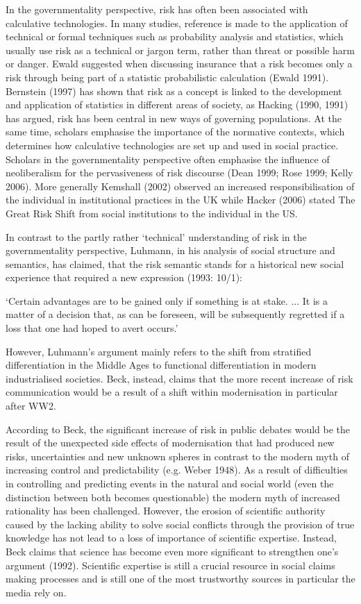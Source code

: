 In the governmentality perspective, risk has often been associated with calculative technologies. In many studies, reference is made to the application of technical or formal techniques such as probability analysis and statistics, which usually use risk as a technical or jargon term, rather than threat or possible harm or danger. Ewald suggested when discussing insurance that a risk becomes only a risk through being part of a statistic probabilistic calculation (Ewald 1991). Bernstein (1997) has shown that risk as a concept is linked to the development and application of statistics in different areas of society, as Hacking (1990, 1991) has argued, risk has been central in new ways of governing populations. At the same time, scholars emphasise the importance of the normative contexts, which determines how calculative technologies are set up and used in social practice. Scholars in the governmentality perspective often emphasise the influence of neoliberalism for the pervasiveness of risk discourse (Dean 1999; Rose 1999; Kelly 2006). More generally Kemshall (2002) observed an increased responsibilisation of the individual in institutional practices in the UK while Hacker (2006) stated The Great Risk Shift from social institutions to the individual in the US. 

In contrast to the partly rather `technical' understanding of risk in the governmentality perspective, Luhmann, in his analysis of social structure and semantics, has claimed, that the risk semantic stands for a historical new social experience that required a new expression (1993: 10\slash 1): 

`Certain advantages are to be gained only if something is at stake. ... It is a matter of a decision that, as can be foreseen, will be subsequently regretted if a loss that one had hoped to avert occurs.'

However, Luhmann's argument mainly refers to the shift from stratified differentiation in the Middle Ages to functional differentiation in modern industrialised societies. Beck, instead, claims that the more recent increase of risk communication would be a result of a shift within modernisation in particular after WW2. 

According to Beck, the significant increase of risk in public debates would be the result of the unexpected side effects of modernisation that had produced new risks, uncertainties and new unknown spheres in contrast to the modern myth of increasing control and predictability (e.g. Weber 1948). As a result of difficulties in controlling and predicting events in the natural and social world (even the distinction between both becomes questionable) the modern myth of increased rationality has been challenged. However, the erosion of scientific authority caused by the lacking ability to solve social conflicts through the provision of true knowledge has not lead to a loss of importance of scientific expertise. Instead, Beck claims that science has become even more significant to strengthen one's argument (1992). Scientific expertise is still a crucial resource in social claims making processes and is still one of the most trustworthy sources in particular the media rely on. 


